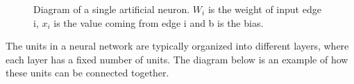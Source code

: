 \begin{figure}[H]
  \centering
    \caption{Diagram of a single artificial neuron. $W_{i}$ is the weight of input edge i, $x_{i}$ is the value coming from edge i and b is the bias.} %
    \label{fig:single_neuron}

\end{figure}

The units in a neural network are typically organized into different layers, where each layer has a fixed number of units. The diagram below is an example of how these units can be connected together.

